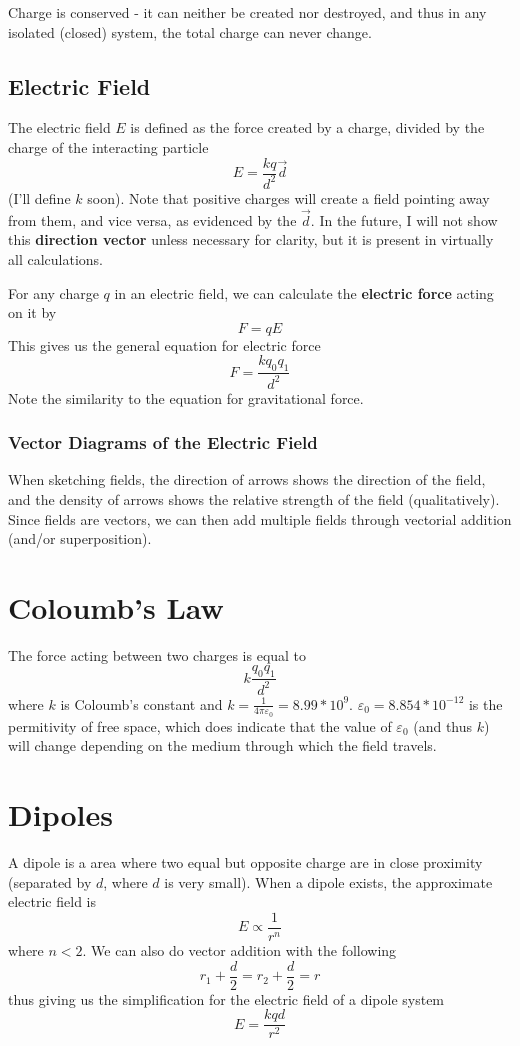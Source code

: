 \documentclass[12pt]{article}
\begin{document}
Charge is conserved - it can neither be created nor destroyed, and thus in any isolated (closed) system, the total charge can  never change.

\subsection*{Electric Field}
The electric field $E$ is defined as the force created by a charge, divided by the charge of the interacting particle \[ E = \frac{kq}{d^2}\vec{d} \] (I'll define $k$ soon). Note that positive charges will create a field pointing away from them, and vice versa, as evidenced by the $\vec{d}$. In the future, I will not show this {\bf direction vector} unless necessary for clarity, but it is present in virtually all calculations.

For any charge $q$ in an electric field, we can calculate the {\bf electric force} acting on it by \[ F = qE \] This gives us the general equation for electric force \[ F = \frac{kq_0q_1}{d^2} \] Note the similarity to the equation for gravitational force.

\subsubsection*{Vector Diagrams of the Electric Field}
When sketching fields, the direction of arrows shows the direction of the field, and the density of arrows shows the relative strength of the field (qualitatively). Since fields are vectors, we can then add multiple fields through vectorial addition (and/or superposition).

\section*{Coloumb's Law}
The force acting between two charges is equal to \[ k\frac{q_0q_1}{d^2} \] where $k$ is Coloumb's constant and $k = \frac{1}{4\pi \varepsilon_0} = 8.99 * 10^9$. $\varepsilon_0 = 8.854 * 10^{-12}$ is the permitivity of free space, which does indicate that the value of $\varepsilon_0$ (and thus $k$) will change depending on the medium through which the field travels.

\section*{Dipoles}
A dipole is a area where two equal but opposite charge are in close proximity (separated by $d$, where $d$ is very small). When a dipole exists, the approximate electric field is \[ E \propto \frac{1}{r^n} \] where $n < 2$. We can also do vector addition with the following \[ r_1 + \frac{d}{2} = r_2 + \frac{d}{2} = r \] thus giving us the simplification for the electric field of a dipole system \[ E = \frac{kqd}{r^2} \]
\end{document}
